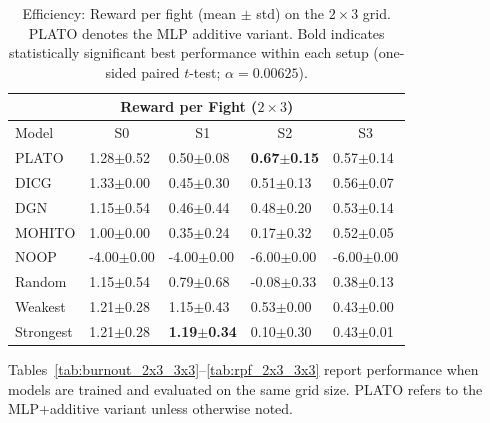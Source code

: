 \begin{table}[t]
\centering
\small
\setlength{\tabcolsep}{2.5pt}
\renewcommand{\arraystretch}{1.03}
\begin{tabular}{l|l|l|l|l}
\toprule
\multicolumn{5}{c}{Reward per Fight ($2\times 3$)} \\
\midrule
Model & \multicolumn{1}{c|}{S0} & \multicolumn{1}{c|}{S1} & \multicolumn{1}{c|}{S2} & \multicolumn{1}{c}{S3} \\
\midrule
PLATO & 1.28$\pm$0.52 & 0.50$\pm$0.08 & \textbf{0.67$\pm$0.15} & 0.57$\pm$0.14 \\
DICG & 1.33$\pm$0.00 & 0.45$\pm$0.30 & 0.51$\pm$0.13 & 0.56$\pm$0.07 \\
DGN & 1.15$\pm$0.54 & 0.46$\pm$0.44 & 0.48$\pm$0.20 & 0.53$\pm$0.14 \\
MOHITO  & 1.00$\pm$0.00 & 0.35$\pm$0.24 & 0.17$\pm$0.32 & 0.52$\pm$0.05 \\
NOOP & -4.00$\pm$0.00 & -4.00$\pm$0.00 & -6.00$\pm$0.00 & -6.00$\pm$0.00 \\
Random & 1.15$\pm$0.54 & 0.79$\pm$0.68 & -0.08$\pm$0.33 & 0.38$\pm$0.13 \\
Weakest & 1.21$\pm$0.28 & 1.15$\pm$0.43 & 0.53$\pm$0.00 & 0.43$\pm$0.00 \\
Strongest & 1.21$\pm$0.28 & \textbf{1.19$\pm$0.34} & 0.10$\pm$0.30 & 0.43$\pm$0.01 \\

\bottomrule
\end{tabular}
\caption{Efficiency: Reward per fight (mean $\pm$ std) on the $2\times 3$ grid. PLATO denotes the MLP additive variant. Bold indicates statistically significant best performance within each setup (one-sided paired $t$-test; $\alpha=0.00625$).}
\label{tab:rpf_2x3}
\end{table}

Tables~\ref{tab:burnout_2x3_3x3}--\ref{tab:rpf_2x3_3x3} report performance when models are trained and evaluated on the same grid size.
PLATO refers to the MLP+additive variant unless otherwise noted.


